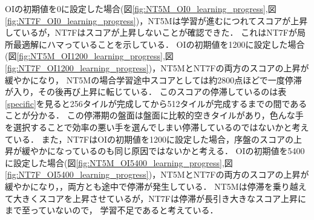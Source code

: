 OIの初期値を0に設定した場合(図\ref{fig:NT5M_OI0_learning_progress},図\ref{fig:NT7F_OI0_learning_progress})，NT5Mは学習が進むにつれてスコアが上昇しているが，NT7Fはスコアが上昇しないことが確認できた．
これはNT7Fが局所最適解にハマっていることを示している．
OIの初期値を1200に設定した場合(図\ref{fig:NT5M_OI1200_learning_progress},図\ref{fig:NT7F_OI1200_learning_progress})，NT5MとNT7Fの両方のスコアの上昇が緩やかになり，
NT5Mの場合学習途中スコアとしては約2800点ほどで一度停滞が入り，その後再び上昇に転じている．
このスコアの停滞しているのは表\ref{specific}を見ると256タイルが完成してから512タイルが完成するまでの間であることが分かる．
この停滞期の盤面は盤面に比較的空きタイルがあり，色んな手を選択することで効率の悪い手を選んでしまい停滞しているのではないかと考えている．
また，NT7FはOIの初期値を1200に設定した場合，序盤のスコアの上昇が緩やかになっているのも同じ原因ではないかと考える．
OIの初期値を5400に設定した場合(図\ref{fig:NT5M_OI5400_learning_progress},図\ref{fig:NT7F_OI5400_learning_progress})，NT5MとNT7Fの両方のスコアの上昇が緩やかになり，，両方とも途中で停滞が発生している．
NT5Mは停滞を乗り越えて大きくスコアを上昇させているが，NT7Fは停滞が長引き大きなスコア上昇にまで至っていないので，
学習不足であると考えている．

